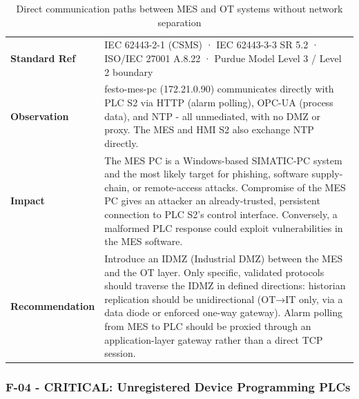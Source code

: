 \begin{table}[H]
\centering
\begin{tabular}{@{}p{}p{}@{}}
\toprule
\textbf{Standard Ref} & IEC 62443-2-1 (CSMS) · IEC 62443-3-3 SR 5.2 · ISO/IEC 27001 A.8.22 · Purdue Model Level 3 / Level 2 boundary \\
\textbf{Observation} & festo-mes-pc (172.21.0.90) communicates directly with PLC S2 via HTTP (alarm polling), OPC-UA (process data), and NTP - all unmediated, with no DMZ or proxy. The MES and HMI S2 also exchange NTP directly. \\
\textbf{Impact} & The MES PC is a Windows-based SIMATIC-PC system and the most likely target for phishing, software supply-chain, or remote-access attacks. Compromise of the MES PC gives an attacker an already-trusted, persistent connection to PLC S2's control interface. Conversely, a malformed PLC response could exploit vulnerabilities in the MES software. \\
\textbf{Recommendation} & Introduce an IDMZ (Industrial DMZ) between the MES and the OT layer. Only specific, validated protocols should traverse the IDMZ in defined directions: historian replication should be unidirectional (OT→IT only, via a data diode or enforced one-way gateway). Alarm polling from MES to PLC should be proxied through an application-layer gateway rather than a direct TCP session. \\
\bottomrule
\end{tabular}
\caption{Direct communication paths between MES and OT systems without network separation}
\end{table}

\subsubsection{F-04 - CRITICAL: Unregistered Device Programming PLCs}

